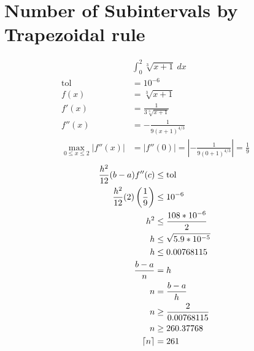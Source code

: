 \section{Number of Subintervals by Trapezoidal rule}
	\begin{align}
		&\int_{0}^{2} \sqrt[3]{x+1} \ dx& \\
		\text{tol} &= 10^{-6}& \\
		f(x) &= \sqrt[3]{x+1}& \\
		f'(x) &= \frac{1}{3\sqrt[3]{x+1}} \\
		f''(x) &= -\frac{1}{9(x+1)^{4/3}}& \\
		\max_{0 \leq x \leq 2} |f''(x)| &= |f''(0)| = \left| -\frac{1}{9(0+1)^{4/3}} \right| = \frac{1}{9}&
	\end{align}
	\begin{align}
		\frac{h^{2}}{12}(b-a)f''(c) &\leq \text{tol}& \\
		\frac{h^{2}}{12}(2)\left(\frac{1}{9}\right) &\leq 10^{-6}& \notag \\
		h^{2} &\leq \frac{108*10^{-6}}{2}& \notag \\
		h &\leq \sqrt{5.9*10^{-5}}& \notag \\
		h &\leq 0.00768115& \\
		\frac{b-a}{n} &= h& \\
		n &= \frac{b-a}{h}& \\
		n &\geq \frac{2}{0.00768115}& \notag \\
		n &\geq 260.37768& \notag \\
		\lceil n \rceil &= 261&
	\end{align}
